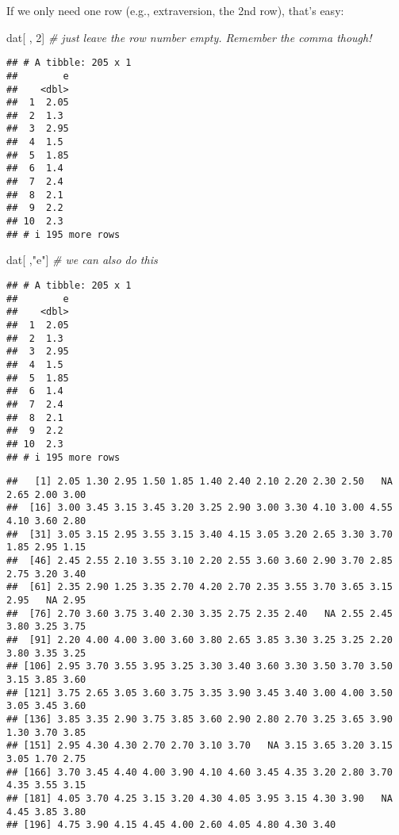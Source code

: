 \documentclass[
]{article}
\newenvironment{Shaded}{\begin{snugshade}}{\end{snugshade}}
\newcommand{\CommentTok}[1]{\textcolor[rgb]{0.56,0.35,0.01}{\textit{#1}}}
\newcommand{\DecValTok}[1]{\textcolor[rgb]{0.00,0.00,0.81}{#1}}
\newcommand{\NormalTok}[1]{#1}
\newcommand{\SpecialCharTok}[1]{\textcolor[rgb]{0.81,0.36,0.00}{\textbf{#1}}}
\newcommand{\StringTok}[1]{\textcolor[rgb]{0.31,0.60,0.02}{#1}}
\begin{document}
If we only need one row (e.g., extraversion, the 2nd row), that's easy:

\begin{Shaded}
\begin{Highlighting}[]
\NormalTok{dat[ , }\DecValTok{2}\NormalTok{] }\CommentTok{\# just leave the row number empty. Remember the comma though!}
\end{Highlighting}
\end{Shaded}

\begin{verbatim}
## # A tibble: 205 x 1
##        e
##    <dbl>
##  1  2.05
##  2  1.3 
##  3  2.95
##  4  1.5 
##  5  1.85
##  6  1.4 
##  7  2.4 
##  8  2.1 
##  9  2.2 
## 10  2.3 
## # i 195 more rows
\end{verbatim}

\begin{Shaded}
\begin{Highlighting}[]
\NormalTok{dat[ ,}\StringTok{"e"}\NormalTok{] }\CommentTok{\# we can also do this}
\end{Highlighting}
\end{Shaded}

\begin{verbatim}
## # A tibble: 205 x 1
##        e
##    <dbl>
##  1  2.05
##  2  1.3 
##  3  2.95
##  4  1.5 
##  5  1.85
##  6  1.4 
##  7  2.4 
##  8  2.1 
##  9  2.2 
## 10  2.3 
## # i 195 more rows
\end{verbatim}

\begin{Shaded}
\end{Shaded}

\begin{verbatim}
##   [1] 2.05 1.30 2.95 1.50 1.85 1.40 2.40 2.10 2.20 2.30 2.50   NA 2.65 2.00 3.00
##  [16] 3.00 3.45 3.15 3.45 3.20 3.25 2.90 3.00 3.30 4.10 3.00 4.55 4.10 3.60 2.80
##  [31] 3.05 3.15 2.95 3.55 3.15 3.40 4.15 3.05 3.20 2.65 3.30 3.70 1.85 2.95 1.15
##  [46] 2.45 2.55 2.10 3.55 3.10 2.20 2.55 3.60 3.60 2.90 3.70 2.85 2.75 3.20 3.40
##  [61] 2.35 2.90 1.25 3.35 2.70 4.20 2.70 2.35 3.55 3.70 3.65 3.15 2.95   NA 2.95
##  [76] 2.70 3.60 3.75 3.40 2.30 3.35 2.75 2.35 2.40   NA 2.55 2.45 3.80 3.25 3.75
##  [91] 2.20 4.00 4.00 3.00 3.60 3.80 2.65 3.85 3.30 3.25 3.25 2.20 3.80 3.35 3.25
## [106] 2.95 3.70 3.55 3.95 3.25 3.30 3.40 3.60 3.30 3.50 3.70 3.50 3.15 3.85 3.60
## [121] 3.75 2.65 3.05 3.60 3.75 3.35 3.90 3.45 3.40 3.00 4.00 3.50 3.05 3.45 3.60
## [136] 3.85 3.35 2.90 3.75 3.85 3.60 2.90 2.80 2.70 3.25 3.65 3.90 1.30 3.70 3.85
## [151] 2.95 4.30 4.30 2.70 2.70 3.10 3.70   NA 3.15 3.65 3.20 3.15 3.05 1.70 2.75
## [166] 3.70 3.45 4.40 4.00 3.90 4.10 4.60 3.45 4.35 3.20 2.80 3.70 4.35 3.55 3.15
## [181] 4.05 3.70 4.25 3.15 3.20 4.30 4.05 3.95 3.15 4.30 3.90   NA 4.45 3.85 3.80
## [196] 4.75 3.90 4.15 4.45 4.00 2.60 4.05 4.80 4.30 3.40
\end{verbatim}
\end{document}
